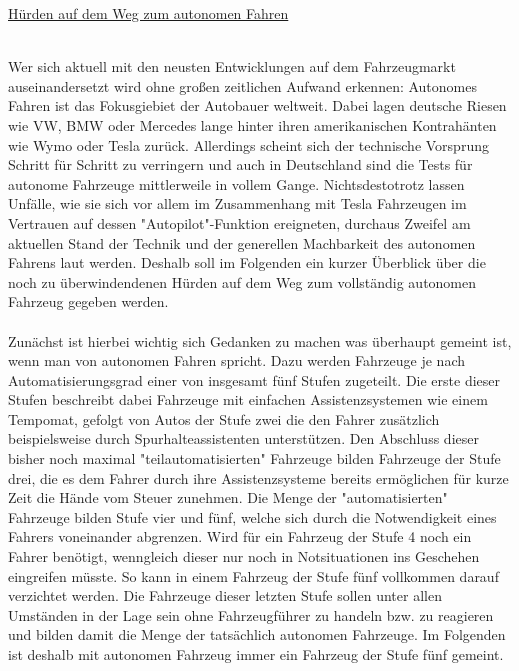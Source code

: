 \documentclass[10pt,a4paper]{article}
\begin{document}
\noindent
\begin{huge}
\underline{Hürden auf dem Weg zum autonomen Fahren}
\end{huge}
\vspace{10mm}
\\
\noindent
Wer sich aktuell mit den neusten Entwicklungen auf dem Fahrzeugmarkt auseinandersetzt wird ohne großen zeitlichen Aufwand erkennen: Autonomes Fahren ist das Fokusgiebiet der Autobauer weltweit. Dabei lagen deutsche Riesen wie VW, BMW oder Mercedes lange hinter ihren amerikanischen Kontrahänten wie Wymo oder Tesla zurück. Allerdings scheint sich der technische Vorsprung Schritt für Schritt zu verringern und auch in Deutschland sind die Tests für autonome Fahrzeuge mittlerweile in vollem Gange. Nichtsdestotrotz lassen Unfälle, wie sie sich vor allem im Zusammenhang mit Tesla Fahrzeugen im Vertrauen auf dessen "Autopilot"-Funktion ereigneten, durchaus Zweifel am aktuellen Stand der Technik und der generellen Machbarkeit des autonomen Fahrens laut werden. Deshalb soll im Folgenden ein kurzer Überblick über die noch zu überwindendenen Hürden auf dem Weg zum vollständig autonomen Fahrzeug gegeben werden.
\\
\\
Zunächst ist hierbei wichtig sich Gedanken zu machen was überhaupt gemeint ist, wenn man von autonomen Fahren spricht. Dazu werden Fahrzeuge je nach Automatisierungsgrad einer von insgesamt fünf Stufen zugeteilt. Die erste dieser Stufen beschreibt dabei Fahrzeuge mit einfachen Assistenzsystemen wie einem Tempomat, gefolgt von Autos der Stufe zwei die den Fahrer zusätzlich beispielsweise durch Spurhalteassistenten unterstützen. Den Abschluss dieser bisher noch maximal "teilautomatisierten" Fahrzeuge bilden Fahrzeuge der Stufe drei, die es dem Fahrer durch ihre Assistenzsysteme bereits ermöglichen für kurze Zeit die Hände vom Steuer zunehmen. Die Menge der "automatisierten" Fahrzeuge bilden Stufe vier und fünf, welche sich durch die Notwendigkeit eines Fahrers voneinander abgrenzen. Wird für ein Fahrzeug der Stufe 4 noch ein Fahrer benötigt, wenngleich dieser nur noch in Notsituationen ins Geschehen eingreifen müsste. So kann in einem Fahrzeug der Stufe fünf vollkommen darauf verzichtet werden. Die Fahrzeuge dieser letzten Stufe sollen unter allen Umständen in der Lage sein ohne Fahrzeugführer zu handeln bzw. zu reagieren und bilden damit die Menge der tatsächlich autonomen Fahrzeuge. Im Folgenden ist deshalb mit autonomen Fahrzeug immer ein Fahrzeug der Stufe fünf gemeint.
\\
\end{document}
